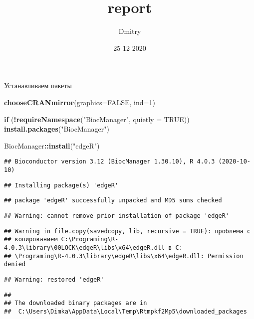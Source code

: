 \documentclass[
]{article}
\title{report}
\author{Dmitry}
\date{25 12 2020}
\newenvironment{Shaded}{\begin{snugshade}}{\end{snugshade}}
\newcommand{\ControlFlowTok}[1]{\textcolor[rgb]{0.13,0.29,0.53}{\textbf{#1}}}
\newcommand{\DataTypeTok}[1]{\textcolor[rgb]{0.13,0.29,0.53}{#1}}
\newcommand{\DecValTok}[1]{\textcolor[rgb]{0.00,0.00,0.81}{#1}}
\newcommand{\KeywordTok}[1]{\textcolor[rgb]{0.13,0.29,0.53}{\textbf{#1}}}
\newcommand{\NormalTok}[1]{#1}
\newcommand{\OperatorTok}[1]{\textcolor[rgb]{0.81,0.36,0.00}{\textbf{#1}}}
\newcommand{\OtherTok}[1]{\textcolor[rgb]{0.56,0.35,0.01}{#1}}
\newcommand{\StringTok}[1]{\textcolor[rgb]{0.31,0.60,0.02}{#1}}
\begin{document}
\maketitle

Устанавливаем пакеты

\begin{Shaded}
\begin{Highlighting}[]
\KeywordTok{chooseCRANmirror}\NormalTok{(}\DataTypeTok{graphics=}\OtherTok{FALSE}\NormalTok{, }\DataTypeTok{ind=}\DecValTok{1}\NormalTok{)}

\ControlFlowTok{if}\NormalTok{ (}\OperatorTok{!}\KeywordTok{requireNamespace}\NormalTok{(}\StringTok{"BiocManager"}\NormalTok{, }\DataTypeTok{quietly =} \OtherTok{TRUE}\NormalTok{))}
  \KeywordTok{install.packages}\NormalTok{(}\StringTok{"BiocManager"}\NormalTok{)}

\NormalTok{BiocManager}\OperatorTok{::}\KeywordTok{install}\NormalTok{(}\StringTok{"edgeR"}\NormalTok{)}
\end{Highlighting}
\end{Shaded}

\begin{verbatim}
## Bioconductor version 3.12 (BiocManager 1.30.10), R 4.0.3 (2020-10-10)
\end{verbatim}

\begin{verbatim}
## Installing package(s) 'edgeR'
\end{verbatim}

\begin{verbatim}
## package 'edgeR' successfully unpacked and MD5 sums checked
\end{verbatim}

\begin{verbatim}
## Warning: cannot remove prior installation of package 'edgeR'
\end{verbatim}

\begin{verbatim}
## Warning in file.copy(savedcopy, lib, recursive = TRUE): проблема с
## копированием C:\Programing\R-4.0.3\library\00LOCK\edgeR\libs\x64\edgeR.dll в C:
## \Programing\R-4.0.3\library\edgeR\libs\x64\edgeR.dll: Permission denied
\end{verbatim}

\begin{verbatim}
## Warning: restored 'edgeR'
\end{verbatim}

\begin{verbatim}
## 
## The downloaded binary packages are in
##  C:\Users\Dimka\AppData\Local\Temp\Rtmpkf2Mp5\downloaded_packages
\end{verbatim}
\end{document}
